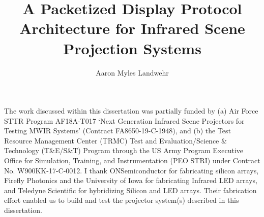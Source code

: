 \documentclass{udthesis}
\begin{document}
    \title[A Packetized Display Protocol Architecture for Infrared Scene Projection Systems]{A Packetized Display Protocol Architecture for Infrared Scene Projection Systems}
    \author{Aaron Myles Landwehr}
    \majorfieldtrue{}
    \subject{Doctor of Philosophy in Electrical and Computer Engineering}

    \maketitlepage

    \begin{approvalpage}
    \end{approvalpage}

    \begin{signedpage} %
    \end{signedpage}

    \begin{front} %
            
            The work discussed within this dissertation was partially funded by (a) Air Force STTR Program AF18A-T017 `Next Generation Infrared Scene Projectors for Testing MWIR Systems' (Contract FA8650-19-C-1948), and (b) the Test Resource Management Center (TRMC) Test and Evaluation/Science \& Technology (T\&E/S\&T) Program through the US Army Program Executive Office for Simulation, Training, and Instrumentation (PEO STRI) under Contract No. W900KK-17-C-0012. I thank ONSemiconductor for fabricating silicon arrays, Firefly Photonics and the University of Iowa for fabricating Infrared LED arrays, and Teledyne Scientific for hybridizing Silicon and LED arrays. Their fabrication effort enabled us to build and test the projector system(s) described in this dissertation.
        \maketocloflot
            
    \end{front}
\end{document}
